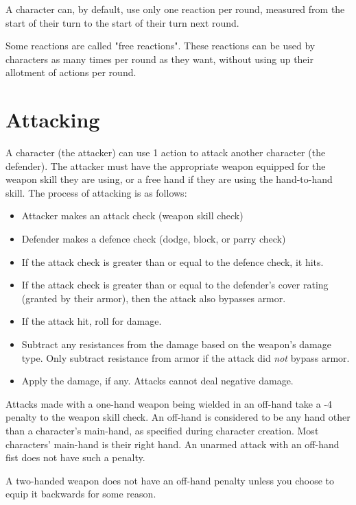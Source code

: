 \begin{multicols*}{2}
    A character can, by default, use only one reaction per round, measured
    from the start of their turn to the start of their turn next round.

    Some reactions are called "free reactions". These
    reactions can be used by characters as many times per round as they want,
    without using up their allotment of actions per round.

    \section{Attacking}\label{combat:attacking}
    A character (the attacker) can use 1 action to attack another character
    (the defender). The attacker must have the appropriate weapon equipped
    for the weapon skill they are using, or a free hand if they are using
    the hand-to-hand skill. The process of attacking is as follows:
    \begin{itemize}
        \item Attacker makes an attack check (weapon skill check)
        \item Defender makes a defence check (dodge, block, or parry check)
        \item If the attack check is greater than or equal to the defence
            check, it hits.
        \item If the attack check is greater than or equal to the defender's
            cover rating (granted by their armor), then
            the attack also bypasses armor.
        \item If the attack hit, roll for damage.
        \item Subtract any resistances from the damage based
            on the weapon's damage type. Only subtract resistance from armor
            if the attack did \textit{not} bypass armor.
        \item Apply the damage, if any. Attacks cannot deal negative
            damage.
    \end{itemize}

    Attacks made with a one-hand weapon being wielded in an off-hand take a -4
    penalty to the weapon skill check. An off-hand is considered to be any hand
    other than a character's main-hand, as specified during character creation.
    Most characters' main-hand is their right hand. An unarmed attack with an
    off-hand fist does not have such a penalty.

    A two-handed weapon does not have an off-hand penalty unless you choose to
    equip it backwards for some reason.


\end{multicols*}
